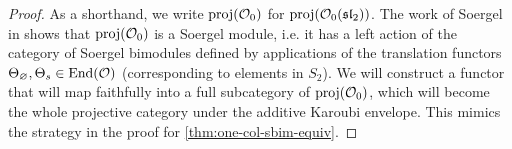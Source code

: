 \begin{proof}
    As a shorthand, we write $\operatorname{proj}(\mathcal{O}_0)$ for $\operatorname{proj}(\mathcal{O}_0(\operatorname{\mathfrak{sl}}_2))$. The work of Soergel in \cite[Section 2.4]{soergel-category-O} shows that $\operatorname{proj}(\mathcal{O}_0)$ is a Soergel module, i.e. it has a left action of the category of Soergel bimodules defined by applications of the translation functors $\Theta_\varnothing, \Theta_s \in \operatorname{End}(\mathcal{O})$ (corresponding to elements in $S_2$).  We will construct a functor that will map faithfully into a full subcategory of $\operatorname{proj}(\mathcal{O}_0)$, which will become the whole projective category under the additive Karoubi envelope. This mimics the strategy in the proof for \autoref{thm:one-col-sbim-equiv}.




\end{proof}
